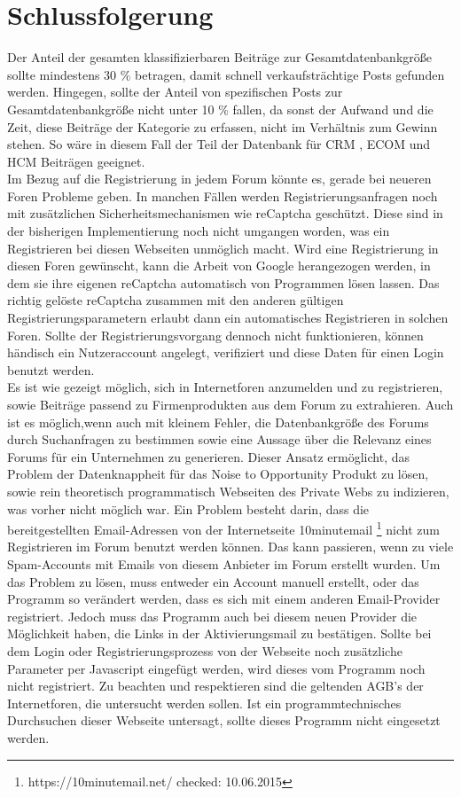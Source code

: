 \section{Schlussfolgerung}
Der Anteil der gesamten klassifizierbaren Beiträge zur Gesamtdatenbankgröße sollte mindestens 30 \% betragen, damit schnell verkaufsträchtige Posts gefunden werden. Hingegen, sollte der Anteil von spezifischen Posts zur Gesamtdatenbankgröße nicht unter 10 \% fallen, da sonst der Aufwand und die Zeit, diese Beiträge der Kategorie zu erfassen, nicht im Verhältnis zum Gewinn stehen. So wäre in diesem Fall der Teil der Datenbank für CRM , ECOM und HCM Beiträgen geeignet.\\
Im Bezug auf die Registrierung in jedem Forum könnte es, gerade bei neueren Foren Probleme geben. In manchen Fällen werden Registrierungsanfragen noch mit zusätzlichen Sicherheitsmechanismen wie reCaptcha geschützt. Diese sind in der bisherigen Implementierung noch nicht umgangen worden, was ein Registrieren bei diesen Webseiten unmöglich macht. Wird eine Registrierung in diesen Foren gewünscht, kann die Arbeit von Google herangezogen werden, in dem sie ihre eigenen reCaptcha automatisch von Programmen lösen lassen. Das richtig gelöste reCaptcha zusammen mit den anderen gültigen Registrierungsparametern erlaubt dann ein automatisches Registrieren in solchen Foren. Sollte der Registrierungsvorgang dennoch nicht funktionieren, können händisch ein Nutzeraccount angelegt, verifiziert und diese Daten für einen Login benutzt werden.\\
Es ist wie gezeigt möglich, sich in Internetforen anzumelden und zu registrieren, sowie Beiträge passend zu Firmenprodukten aus dem Forum zu extrahieren.
Auch ist es möglich,wenn auch mit kleinem Fehler, die Datenbankgröße des Forums durch Suchanfragen zu bestimmen sowie eine Aussage über die Relevanz eines Forums für ein Unternehmen zu generieren. Dieser Ansatz ermöglicht, das Problem der Datenknappheit für das Noise to Opportunity Produkt zu lösen, sowie rein theoretisch programmatisch Webseiten des Private Webs zu indizieren, was vorher nicht möglich war. Ein Problem besteht darin, dass die bereitgestellten Email-Adressen von der Internetseite 10minutemail \footnote{https://10minutemail.net/ checked: 10.06.2015} nicht zum Registrieren im Forum benutzt werden können. Das kann passieren, wenn zu viele Spam-Accounts mit Emails von diesem Anbieter im Forum erstellt wurden. Um das Problem zu lösen, muss entweder ein Account manuell erstellt, oder das Programm so verändert werden, dass es sich mit einem anderen Email-Provider registriert. Jedoch muss das Programm auch bei diesem neuen Provider die Möglichkeit haben, die Links in der Aktivierungsmail zu bestätigen.
Sollte bei dem Login oder Registrierungsprozess von der Webseite noch zusätzliche Parameter per Javascript eingefügt werden, wird dieses vom Programm noch nicht registriert.
Zu beachten und respektieren sind die geltenden AGB's der Internetforen, die untersucht werden sollen. Ist ein programmtechnisches Durchsuchen dieser Webseite untersagt, sollte dieses Programm nicht eingesetzt werden.